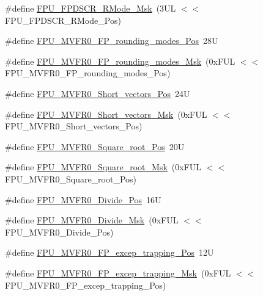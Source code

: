 \begin{DoxyCompactItemize}
\item 
\#define \mbox{\hyperlink{group___c_m_s_i_s___f_p_u_ga449beb50211f8e97df6b2640c82c4741}{F\+P\+U\+\_\+\+F\+P\+D\+S\+C\+R\+\_\+\+R\+Mode\+\_\+\+Msk}}~(3\+U\+L $<$$<$ F\+P\+U\+\_\+\+F\+P\+D\+S\+C\+R\+\_\+\+R\+Mode\+\_\+\+Pos)
\item 
\#define \mbox{\hyperlink{group___c_m_s_i_s___f_p_u_ga1ebcc9076f08013f0ea814540df03e82}{F\+P\+U\+\_\+\+M\+V\+F\+R0\+\_\+\+F\+P\+\_\+rounding\+\_\+modes\+\_\+\+Pos}}~28U
\item 
\#define \mbox{\hyperlink{group___c_m_s_i_s___f_p_u_gae6dc9339ac72227d5d54360bb9fbef1b}{F\+P\+U\+\_\+\+M\+V\+F\+R0\+\_\+\+F\+P\+\_\+rounding\+\_\+modes\+\_\+\+Msk}}~(0x\+F\+U\+L $<$$<$ F\+P\+U\+\_\+\+M\+V\+F\+R0\+\_\+\+F\+P\+\_\+rounding\+\_\+modes\+\_\+\+Pos)
\item 
\#define \mbox{\hyperlink{group___c_m_s_i_s___f_p_u_gabbf83a918536ebf10889cee71a0404c7}{F\+P\+U\+\_\+\+M\+V\+F\+R0\+\_\+\+Short\+\_\+vectors\+\_\+\+Pos}}~24U
\item 
\#define \mbox{\hyperlink{group___c_m_s_i_s___f_p_u_gabf261a72023fdfc64f32c6b21d55c5b9}{F\+P\+U\+\_\+\+M\+V\+F\+R0\+\_\+\+Short\+\_\+vectors\+\_\+\+Msk}}~(0x\+F\+U\+L $<$$<$ F\+P\+U\+\_\+\+M\+V\+F\+R0\+\_\+\+Short\+\_\+vectors\+\_\+\+Pos)
\item 
\#define \mbox{\hyperlink{group___c_m_s_i_s___f_p_u_ga176c85453ba03257bf263adec05f7344}{F\+P\+U\+\_\+\+M\+V\+F\+R0\+\_\+\+Square\+\_\+root\+\_\+\+Pos}}~20U
\item 
\#define \mbox{\hyperlink{group___c_m_s_i_s___f_p_u_ga3ec0bfec1640bdaf9dff027f275b446d}{F\+P\+U\+\_\+\+M\+V\+F\+R0\+\_\+\+Square\+\_\+root\+\_\+\+Msk}}~(0x\+F\+U\+L $<$$<$ F\+P\+U\+\_\+\+M\+V\+F\+R0\+\_\+\+Square\+\_\+root\+\_\+\+Pos)
\item 
\#define \mbox{\hyperlink{group___c_m_s_i_s___f_p_u_ga167be203091e6cc7d00ad40ca48c4396}{F\+P\+U\+\_\+\+M\+V\+F\+R0\+\_\+\+Divide\+\_\+\+Pos}}~16U
\item 
\#define \mbox{\hyperlink{group___c_m_s_i_s___f_p_u_gaeb7370768c6cdf06f8a15c86c6102ed2}{F\+P\+U\+\_\+\+M\+V\+F\+R0\+\_\+\+Divide\+\_\+\+Msk}}~(0x\+F\+U\+L $<$$<$ F\+P\+U\+\_\+\+M\+V\+F\+R0\+\_\+\+Divide\+\_\+\+Pos)
\item 
\#define \mbox{\hyperlink{group___c_m_s_i_s___f_p_u_ga5c0715c41c4470f8bb0b6dcd34707f1c}{F\+P\+U\+\_\+\+M\+V\+F\+R0\+\_\+\+F\+P\+\_\+excep\+\_\+trapping\+\_\+\+Pos}}~12U
\item 
\#define \mbox{\hyperlink{group___c_m_s_i_s___f_p_u_ga29bbddd679e821e050699fda23e6c85e}{F\+P\+U\+\_\+\+M\+V\+F\+R0\+\_\+\+F\+P\+\_\+excep\+\_\+trapping\+\_\+\+Msk}}~(0x\+F\+U\+L $<$$<$ F\+P\+U\+\_\+\+M\+V\+F\+R0\+\_\+\+F\+P\+\_\+excep\+\_\+trapping\+\_\+\+Pos)

\end{DoxyCompactItemize}
